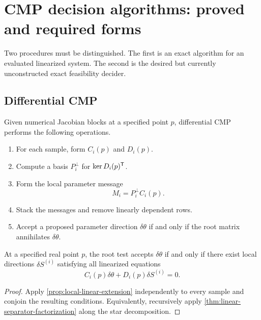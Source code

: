 \section{CMP decision algorithms: proved and required forms}
\label{sec:algorithm}

Two procedures must be distinguished.  The first is an exact algorithm for an
evaluated linearized system.  The second is the desired but currently
unconstructed exact feasibility decider.

\subsection{Differential CMP}

Given numerical Jacobian blocks at a specified point \(p\), differential CMP
performs the following operations.

\begin{enumerate}
  \item For each sample, form \(C_i(p)\) and \(D_i(p)\).
  \item Compute a basis \(P_i^\perp\) for
  \(\operatorname{ker} D_i(p)^{\mathsf T}\).
  \item Form the local parameter message
  \begin{equation}
    M_i=P_i^\perp C_i(p).
  \end{equation}
  \item Stack the messages and remove linearly dependent rows.
  \item Accept a proposed parameter direction \(\delta\theta\) if and only if
  the root matrix annihilates \(\delta\theta\).
\end{enumerate}

\begin{theorem}
\label{thm:differential-cmp-correct}
At a specified real point \(p\), the root test accepts
\(\delta\theta\) if and only if there exist local directions
\(\delta S^{(i)}\) satisfying all linearized equations
\begin{equation}
  C_i(p)\delta\theta+D_i(p)\delta S^{(i)}=0.
\end{equation}
\end{theorem}

\begin{proof}
Apply \cref{prop:local-linear-extension} independently to every sample and
conjoin the resulting conditions.  Equivalently, recursively apply
\cref{thm:linear-separator-factorization} along the star decomposition.
\end{proof}

